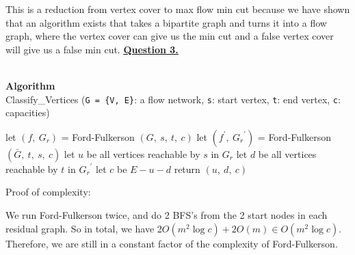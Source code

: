 \documentclass[12pt]{article}
\begin{document}
This is a reduction from vertex cover to max flow min cut because we have shown that an algorithm exists
that takes a bipartite graph and turns it into a flow graph, where the vertex cover can give us the min cut
and a false vertex cover will give us a false min cut.
\newpage
\hyperlink{toc}{\hypertarget{3}{\LARGE \underline{\textbf{Question 3.}}}}\\\\
\begin{algorithm}
  \caption*{\textbf{Algorithm}\\Classify\_Vertices \big(\texttt{G = \{V, E\}}: a flow network, \texttt{s}: start vertex, \texttt{t}: end vertex, \texttt{c}: capacities\big)}\label{alg:cap}
	\begin{algorithmic}[1]
    \State let $(f,\ G_r)$ = Ford-Fulkerson $(G,\ s,\ t,\ c)$
    \State let $(f^\prime,\ {G_r}^\prime)$ = Ford-Fulkerson $(\bar{G},\ t,\ s,\ c)$
    \State
    \State let $u$ be all vertices reachable by $s$ in $G_r$
    \State let $d$ be all vertices reachable by $t$ in ${G_r}^\prime$
    \State let $c$ be $E - u - d$
    \State
    \State return $(u,\ d,\ c)$
	\end{algorithmic}
\end{algorithm}

Proof of complexity:
\begin{adjustwidth}{10mm}{}
	We run Ford-Fulkerson twice, and do 2 BFS's from the 2 start nodes in each residual graph.
	So in total, we have 2$O(m^2 \log c) + 2O(m) \in O(m^2 \log c)$. Therefore, we are still in a
	constant factor of the complexity of Ford-Fulkerson.\\
\end{adjustwidth}
\end{document}
